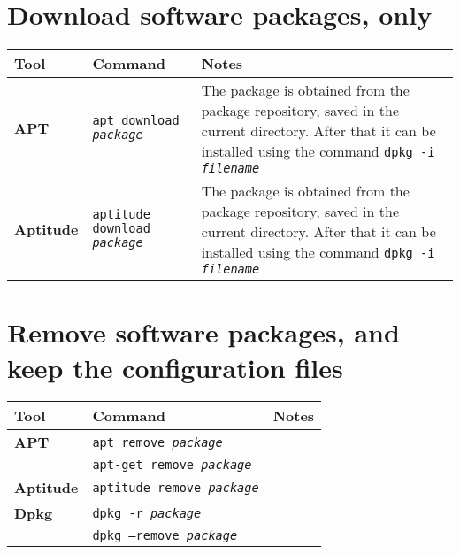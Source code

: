 \documentclass[10pt]{article}
\begin{document}
\section{Download software packages, only}
\begin{tabular}{ p{3.5cm} p{9cm} p{11cm}}
  \hline
  \rowcolor{Gray}
  \textbf{Tool} & \textbf{Command} & \textbf{Notes} \\
  \hline 
  \textbf{APT} & \texttt{apt download \textit{package}} & The package is obtained from the package repository, saved in the current directory. After that it can be installed using the command \newline \texttt{dpkg -i \textit{filename}}\\
  \rowcolor{Gray}
  \textbf{Aptitude} & \texttt{aptitude download \textit{package}} & The package is obtained from the package repository, saved in the current directory. After that it can be installed using the command \newline \texttt{dpkg -i \textit{filename}} \\
  \hline
\end{tabular}

\section{Remove software packages, and keep the configuration files}
\begin{tabular}{ p{3.5cm} p{9cm} p{11cm}}
  \hline
  \rowcolor{Gray}
  \textbf{Tool} & \textbf{Command} & \textbf{Notes} \\
  \hline 
  \textbf{APT} & \texttt{apt remove \textit{package}} & \\
  \rowcolor{Gray}
  & \texttt{apt-get remove \textit{package}} & \\
  \textbf{Aptitude} & \texttt{aptitude remove \textit{package}} & \\
  \rowcolor{Gray}
  \textbf{Dpkg} & \texttt{dpkg -r \textit{package}} & \\
  & \texttt{dpkg --remove \textit{package}} & \\
  \hline
\end{tabular}

\newpage

\cheatsheet
\end{document}
